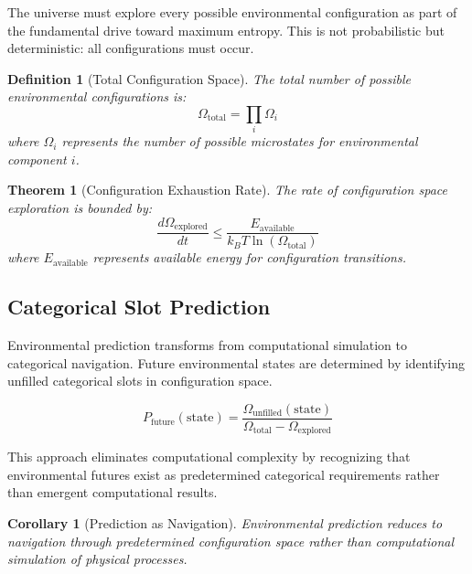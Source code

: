 \documentclass[12pt,a4paper]{article}
\newtheorem{theorem}{Theorem}
\newtheorem{corollary}{Corollary}
\newtheorem{definition}{Definition}
\begin{document}
The universe must explore every possible environmental configuration as part of the fundamental drive toward maximum entropy. This is not probabilistic but deterministic: all configurations must occur.

\begin{definition}[Total Configuration Space]
The total number of possible environmental configurations is:
\begin{equation}
\Omega_{\text{total}} = \prod_i \Omega_i
\end{equation}
where $\Omega_i$ represents the number of possible microstates for environmental component $i$.
\end{definition}

\begin{theorem}[Configuration Exhaustion Rate]
The rate of configuration space exploration is bounded by:
\begin{equation}
\frac{d\Omega_{\text{explored}}}{dt} \leq \frac{E_{\text{available}}}{k_B T \ln(\Omega_{\text{total}})}
\end{equation}
where $E_{\text{available}}$ represents available energy for configuration transitions.
\end{theorem}

\subsection{Categorical Slot Prediction}

Environmental prediction transforms from computational simulation to categorical navigation. Future environmental states are determined by identifying unfilled categorical slots in configuration space.

\begin{equation}
P_{\text{future}}(\text{state}) = \frac{\Omega_{\text{unfilled}}(\text{state})}{\Omega_{\text{total}} - \Omega_{\text{explored}}}
\end{equation}

This approach eliminates computational complexity by recognizing that environmental futures exist as predetermined categorical requirements rather than emergent computational results.

\begin{corollary}[Prediction as Navigation]
Environmental prediction reduces to navigation through predetermined configuration space rather than computational simulation of physical processes.
\end{corollary}
\end{document}
